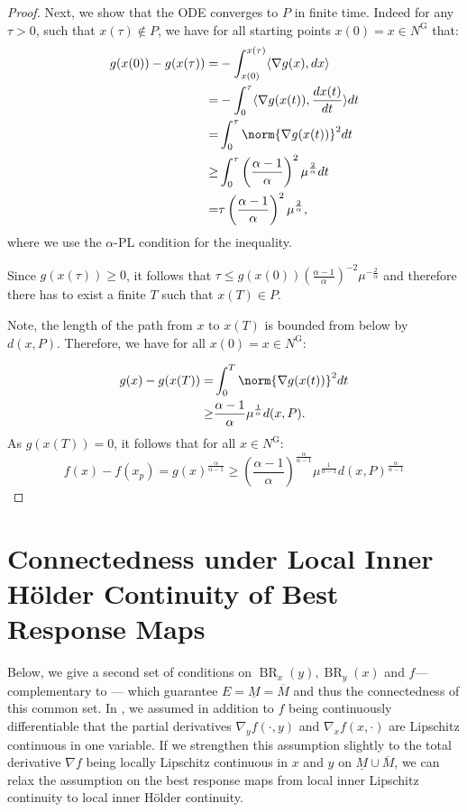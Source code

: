 \documentclass{article}
\DeclareMathOperator{\BR}{BR}
\begin{document}
\begin{proof}
    Next, we show that the ODE converges to $P$ in finite time.
    Indeed for any $\tau>0$, such that $x(\tau)\notin P$, we have for all starting points $x(0)=x\in N^{\text{G}}$ that: 
    \begin{align*}
        g(x(0))-g(x(\tau))=& - \int_{x(0)}^{x(\tau)} \langle \nabla g(x), dx \rangle \\
        = & - \int_{0}^{\tau} \langle \nabla g(x(t)), \frac{dx(t)}{dt} \rangle dt \\
        = & \int_0^\tau \norm{\nabla g(x(t))}^2 dt \\
        \geq & \int_0^\tau \left(\frac{\alpha-1}{\alpha}\right)^2 \mu ^ {\frac{2}{\alpha}} dt \\
        =& \tau \left(\frac{\alpha-1}{\alpha}\right)^2 \mu ^ {\frac{2}{\alpha}},
    \end{align*}
    where we use the $\alpha$-PL condition for the inequality.

    Since $g(x(\tau))\geq 0$, it follows that $\tau \leq g(x(0))\left(\frac{\alpha-1}{\alpha}\right)^{-2} \mu ^ {-\frac{2}{\alpha}} $ and therefore there has to exist a finite $T$ such that $x(T)\in P$.

    Note, the length of the path from $x$ to $x(T)$ is bounded from below by $d(x,P)$. Therefore, we have for all $x(0)=x\in N^{\text{G}}$:


    \begin{align*}
        g(x)-g(x(T))=& \int_0^T \norm{\nabla g(x(t))}^2 dt \\
        \geq & \frac{\alpha-1}{\alpha} \mu ^ {\frac{1}{\alpha}} d(x,P).
    \end{align*}
    As $g(x(T))=0$, it follows that for all $x\in N^{\text{G}}$:
    \[
    f(x)-f(x_p)=g(x)^{\frac{\alpha}{\alpha-1}}\geq \left(\frac{\alpha-1}{\alpha}\right)^{\frac{\alpha}{\alpha-1}} \mu^{\frac{1}{\alpha-1}} d(x,P)^\frac{\alpha}{\alpha-1}
    \]

\end{proof}



\section{Connectedness under Local Inner Hölder Continuity of Best Response Maps} 
\label{app:Holder}
Below, we give a second set of conditions on $\BR_x(y),\BR_y(x)$ and $f$---complementary to ---
which guarantee $E=\underline{M}=\overline{M}$ and thus the connectedness of this common set. In , we assumed in addition to $f$ being continuously differentiable that the partial derivatives $\nabla_y f(\cdot,y)$ and $\nabla_x f(x,\cdot)$ are Lipschitz continuous in one variable. If we strengthen this assumption slightly to the total derivative $\nabla f$ being locally Lipschitz continuous in $x$ and $y$ on $\underline{M} \cup \overline{M}$, we can relax the assumption on the best response maps from local inner Lipschitz continuity to local inner Hölder continuity. 
\end{document}
